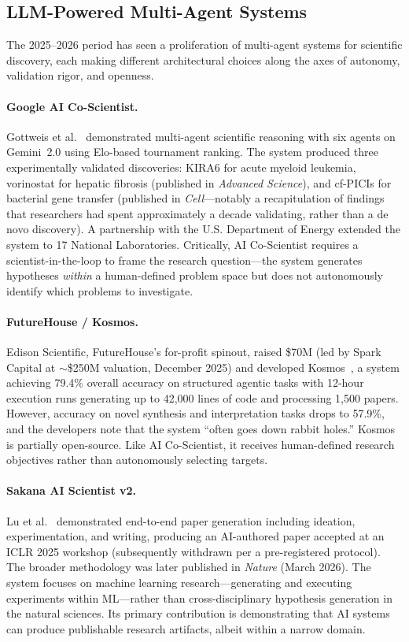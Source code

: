 \subsection{LLM-Powered Multi-Agent Systems}

The 2025--2026 period has seen a proliferation of multi-agent systems for scientific discovery, each making different architectural choices along the axes of autonomy, validation rigor, and openness.

\paragraph{Google AI Co-Scientist.} Gottweis et al.~\citep{gottweis2025} demonstrated multi-agent scientific reasoning with six agents on Gemini~2.0 using Elo-based tournament ranking. The system produced three experimentally validated discoveries: KIRA6 for acute myeloid leukemia, vorinostat for hepatic fibrosis (published in \emph{Advanced Science}), and cf-PICIs for bacterial gene transfer (published in \emph{Cell}---notably a recapitulation of findings that researchers had spent approximately a decade validating, rather than a de novo discovery). A partnership with the U.S. Department of Energy extended the system to 17 National Laboratories. Critically, AI Co-Scientist requires a scientist-in-the-loop to frame the research question---the system generates hypotheses \emph{within} a human-defined problem space but does not autonomously identify which problems to investigate.

\paragraph{FutureHouse / Kosmos.} Edison Scientific, FutureHouse's for-profit spinout, raised \$70M (led by Spark Capital at $\sim$\$250M valuation, December 2025) and developed Kosmos~\citep{mitchener2025}, a system achieving 79.4\% overall accuracy on structured agentic tasks with 12-hour execution runs generating up to 42,000 lines of code and processing 1,500 papers. However, accuracy on novel synthesis and interpretation tasks drops to 57.9\%, and the developers note that the system ``often goes down rabbit holes.'' Kosmos is partially open-source. Like AI Co-Scientist, it receives human-defined research objectives rather than autonomously selecting targets.

\paragraph{Sakana AI Scientist v2.} Lu et al.~\citep{lu2024} demonstrated end-to-end paper generation including ideation, experimentation, and writing, producing an AI-authored paper accepted at an ICLR 2025 workshop (subsequently withdrawn per a pre-registered protocol). The broader methodology was later published in \emph{Nature} (March 2026). The system focuses on machine learning research---generating and executing experiments within ML---rather than cross-disciplinary hypothesis generation in the natural sciences. Its primary contribution is demonstrating that AI systems can produce publishable research artifacts, albeit within a narrow domain.

